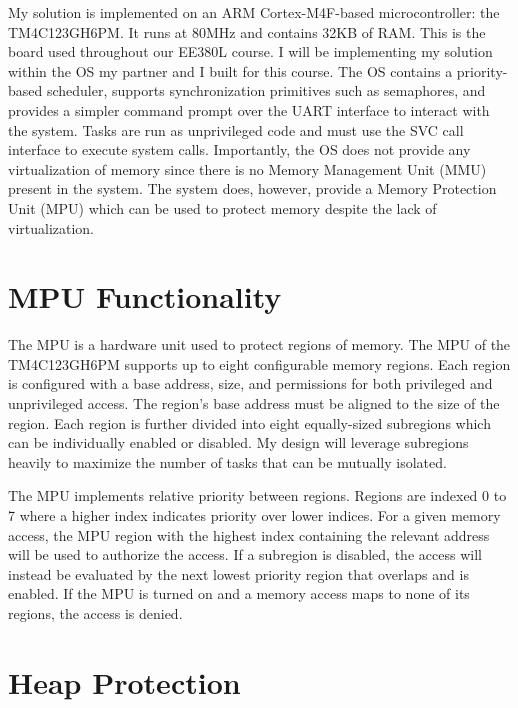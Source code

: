 My solution is implemented on an ARM Cortex-M4F-based microcontroller: the TM4C123GH6PM. It runs at 80MHz and contains 32KB of RAM. This is the board used throughout our EE380L course. I will be implementing my solution within the OS my partner and I built for this course. The OS contains a priority-based scheduler, supports synchronization primitives such as semaphores, and provides a simpler command prompt over the UART interface to interact with the system. Tasks are run as unprivileged code and must use the SVC call interface to execute system calls. Importantly, the OS does not provide any virtualization of memory since there is no Memory Management Unit (MMU) present in the system. The system does, however, provide a Memory Protection Unit (MPU) which can be used to protect memory despite the lack of virtualization.

\section{MPU Functionality}

The MPU is a hardware unit used to protect regions of memory. The MPU of the TM4C123GH6PM supports up to eight configurable memory regions. Each region is configured with a base address, size, and permissions for both privileged and unprivileged access. The region's base address must be aligned to the size of the region. Each region is further divided into eight equally-sized subregions which can be individually enabled or disabled. My design will leverage subregions heavily to maximize the number of tasks that can be mutually isolated.

The MPU implements relative priority between regions. Regions are indexed 0 to 7 where a higher index indicates priority over lower indices. For a given memory access, the MPU region with the highest index containing the relevant address will be used to authorize the access. If a subregion is disabled, the access will instead be evaluated by the next lowest priority region that overlaps and is enabled. If the MPU is turned on and a memory access maps to none of its regions, the access is denied.

\section{Heap Protection}

